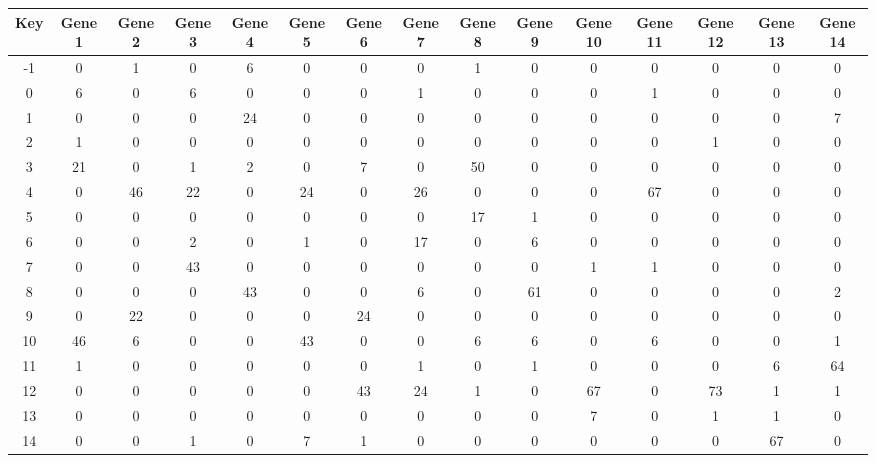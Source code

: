\begin{tabular}{|c|c|c|c|c|c|c|c|c|c|c|c|c|c|c|}
\hline
Key & Gene 1 & Gene 2 & Gene 3 & Gene 4 & Gene 5 & Gene 6 & Gene 7 & Gene 8 & Gene 9 & Gene 10 & Gene 11 & Gene 12 & Gene 13 & Gene 14 \\
\hline
-1 & 0 & 1 & 0 & 6 & 0 & 0 & 0 & 1 & 0 & 0 & 0 & 0 & 0 & 0 \\
0 & 6 & 0 & 6 & 0 & 0 & 0 & 1 & 0 & 0 & 0 & 1 & 0 & 0 & 0 \\
1 & 0 & 0 & 0 & 24 & 0 & 0 & 0 & 0 & 0 & 0 & 0 & 0 & 0 & 7 \\
2 & 1 & 0 & 0 & 0 & 0 & 0 & 0 & 0 & 0 & 0 & 0 & 1 & 0 & 0 \\
3 & 21 & 0 & 1 & 2 & 0 & 7 & 0 & 50 & 0 & 0 & 0 & 0 & 0 & 0 \\
4 & 0 & 46 & 22 & 0 & 24 & 0 & 26 & 0 & 0 & 0 & 67 & 0 & 0 & 0 \\
5 & 0 & 0 & 0 & 0 & 0 & 0 & 0 & 17 & 1 & 0 & 0 & 0 & 0 & 0 \\
6 & 0 & 0 & 2 & 0 & 1 & 0 & 17 & 0 & 6 & 0 & 0 & 0 & 0 & 0 \\
7 & 0 & 0 & 43 & 0 & 0 & 0 & 0 & 0 & 0 & 1 & 1 & 0 & 0 & 0 \\
8 & 0 & 0 & 0 & 43 & 0 & 0 & 6 & 0 & 61 & 0 & 0 & 0 & 0 & 2 \\
9 & 0 & 22 & 0 & 0 & 0 & 24 & 0 & 0 & 0 & 0 & 0 & 0 & 0 & 0 \\
10 & 46 & 6 & 0 & 0 & 43 & 0 & 0 & 6 & 6 & 0 & 6 & 0 & 0 & 1 \\
11 & 1 & 0 & 0 & 0 & 0 & 0 & 1 & 0 & 1 & 0 & 0 & 0 & 6 & 64 \\
12 & 0 & 0 & 0 & 0 & 0 & 43 & 24 & 1 & 0 & 67 & 0 & 73 & 1 & 1 \\
13 & 0 & 0 & 0 & 0 & 0 & 0 & 0 & 0 & 0 & 7 & 0 & 1 & 1 & 0 \\
14 & 0 & 0 & 1 & 0 & 7 & 1 & 0 & 0 & 0 & 0 & 0 & 0 & 67 & 0 \\
\hline
\end{tabular}